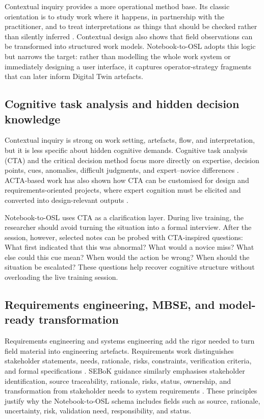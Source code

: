 Contextual inquiry provides a more operational method base. Its classic orientation is to study work where it happens, in partnership with the practitioner, and to treat interpretations as things that should be checked rather than silently inferred \cite{beyer1995apprenticing,beyer1997contextual}. Contextual design also shows that field observations can be transformed into structured work models. Notebook-to-OSL adopts this logic but narrows the target: rather than modelling the whole work system or immediately designing a user interface, it captures operator-strategy fragments that can later inform Digital Twin artefacts.

\subsection{Cognitive task analysis and hidden decision knowledge}

Contextual inquiry is strong on work setting, artefacts, flow, and interpretation, but it is less specific about hidden cognitive demands. Cognitive task analysis (CTA) and the critical decision method focus more directly on expertise, decision points, cues, anomalies, difficult judgments, and expert--novice differences \cite{crandall2006workingminds,klein1989critical}. ACTA-based work has also shown how CTA can be customised for design and requirements-oriented projects, where expert cognition must be elicited and converted into design-relevant outputs \cite{stanik2021acta}.

Notebook-to-OSL uses CTA as a clarification layer. During live training, the researcher should avoid turning the situation into a formal interview. After the session, however, selected notes can be probed with CTA-inspired questions: What first indicated that this was abnormal? What would a novice miss? What else could this cue mean? When would the action be wrong? When should the situation be escalated? These questions help recover cognitive structure without overloading the live training session.

\subsection{Requirements engineering, MBSE, and model-ready transformation}

Requirements engineering and systems engineering add the rigor needed to turn field material into engineering artefacts. Requirements work distinguishes stakeholder statements, needs, rationale, risks, constraints, verification criteria, and formal specifications \cite{vanlamsweerde2009requirements}. SEBoK guidance similarly emphasises stakeholder identification, source traceability, rationale, risks, status, ownership, and transformation from stakeholder needs to system requirements \cite{sebokStakeholder,sebokRequirements}. These principles justify why the Notebook-to-OSL schema includes fields such as source, rationale, uncertainty, risk, validation need, responsibility, and status.

